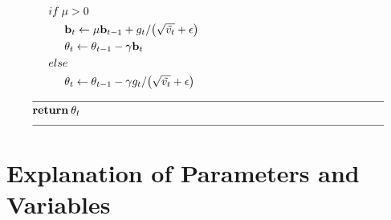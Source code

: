 \documentclass{article}
\begin{document}
\[\begin{aligned}
    & \hspace{5mm} if \: \mu > 0 \\
    & \hspace{10mm} \textbf{b}_t \leftarrow \mu \textbf{b}_{t-1} + g_t / \big(\sqrt{\tilde{v_t}} + \epsilon \big) \\
    & \hspace{10mm} \theta_t \leftarrow \theta_{t-1} - \gamma \textbf{b}_t \\
    & \hspace{5mm} else \\
    & \hspace{10mm} \theta_t \leftarrow \theta_{t-1} - \gamma g_t / \big(\sqrt{\tilde{v_t}} + \epsilon \big) \hspace{3mm} \\
    & \rule{110mm}{0.4pt} \\[-1.ex]
    & \textbf{return} \: \theta_t \\[-1.ex]
    & \rule{110mm}{0.4pt} \\[-1.ex]
\end{aligned}
\]

\section*{Explanation of Parameters and Variables}
\end{document}

